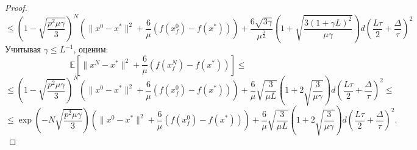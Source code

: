\documentclass{article}
\begin{document}
\begin{proof}
$$\leqslant \left(1 - \sqrt{\frac{p^2\mu\gamma}{3}}\right)^N \left(\|x^0 - x^*\|^2 + \frac{6}{\mu} (f(x_f^0) - f(x^*))\right) + \frac{6 \sqrt{3\gamma}}{\mu^\frac{3}{2}} \left(1 + \sqrt{\frac{3(1 + \gamma L)^2}{\mu \gamma}}\right) d \left(\frac{L\tau}{2} + \frac{\Delta}{\tau}\right)^2$$
Учитывая $\gamma \leqslant L^{-1}$, оценим:
$$\mathbb{E}[\|x^N - x^*\|^2 + \frac{6}{\mu} (f(x_f^N) - f(x^*))] \leqslant$$
$$\leqslant \left(1 - \sqrt{\frac{p^2\mu\gamma}{3}}\right)^N \left(\|x^0 - x^*\|^2 + \frac{6}{\mu} (f(x_f^0) - f(x^*))\right) + \frac{6}{\mu} \sqrt{\frac{3}{\mu L}} \left(1 + 2\sqrt{\frac{3}{\mu \gamma}}\right) d \left(\frac{L\tau}{2} + \frac{\Delta}{\tau}\right)^2 \leqslant$$
$$\leqslant \exp\left(- N\sqrt{\frac{p^2\mu\gamma}{3}}\right) \left(\|x^0 - x^*\|^2 + \frac{6}{\mu} (f(x_f^0) - f(x^*))\right) + \frac{6}{\mu} \sqrt{\frac{3}{\mu L}} \left(1 + 2\sqrt{\frac{3}{\mu \gamma}}\right) d \left(\frac{L\tau}{2} + \frac{\Delta}{\tau}\right)^2.$$
\end{proof}
\end{document}
